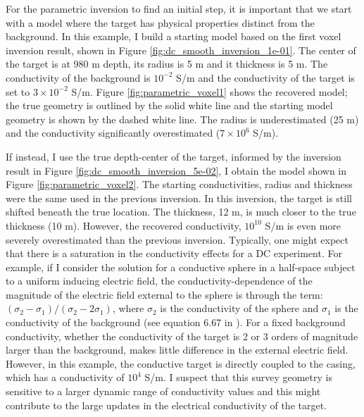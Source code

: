 For the parametric inversion to find an initial step, it is important that we start with a model where the target has physical properties distinct from the background. In this example, I build a starting model based on the first voxel inversion result, shown in Figure \ref{fig:dc_smooth_inversion_1e-01}. The center of the target is at 980 m depth, its radius is 5 m and it thickness is 5 m. The conductivity of the background is $10^{-2}$ S/m and the conductivity of the target is set to $3 \times 10^{-2}$ S/m. Figure \ref{fig:parametric_voxel1} shows the recovered model; the true geometry is outlined by the solid white line and the starting model geometry is shown by the dashed white line. The radius is underestimated (25 m) and the conductivity significantly overestimated ($7 \times 10^6$ S/m).




If instead, I use the true depth-center of the target, informed by the inversion result in Figure \ref{fig:dc_smooth_inversion_5e-02}, I obtain the model shown in Figure \ref{fig:parametric_voxel2}. The starting conductivities, radius and thickness were the same used in the previous inversion. In this inversion, the target is still shifted beneath the true location. The thickness, 12 m, is much closer to the true thickness (10 m). However, the recovered conductivity, $10^{10}$ S/m is even more severely overestimated than the previous inversion. Typically, one might expect that there is a saturation in the conductivity effects for a DC experiment. For example, if I consider the solution for a conductive sphere in a half-space subject to a uniform inducing electric field, the conductivity-dependence of the magnitude of the electric field external to the sphere is through the term:$(\sigma_2 - \sigma_1)/(\sigma_2 - 2\sigma_1)$, where $\sigma_2$ is the conductivity of the sphere and $\sigma_1$ is the conductivity of the background (see equation 6.67 in \cite{Ward1988}). For a fixed background conductivity, whether the conductivity of the target is 2 or 3 orders of magnitude larger than the background, makes little difference in the external electric field. However, in this example, the conductive target is directly coupled to the casing, which has a conductivity of $10^4$ S/m. I suspect that this survey geometry is sensitive to a larger dynamic range of conductivity values and this might contribute to the large updates in the electrical conductivity of the target.



